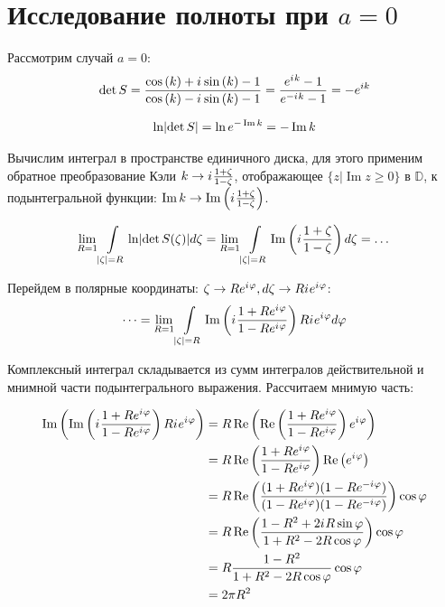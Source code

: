 \documentclass{nsart_eng}
\let\ge\geqslant
\DeclarePairedDelimiter{\abs}{\lvert}{\rvert}
\newcommand{\bbD}{\mathbb{D}}
\newcommand{\eexp}[1]{e^{#1}}
\newcommand{\iu}{{i\mkern1mu}}
\renewcommand{\Re}{\operatorname{Re}}
\renewcommand{\Im}{\operatorname{Im}}
\renewcommand{\phi}{\varphi}
\begin{document}
\section{Исследование полноты при $a=0$}
Рассмотрим случай $a=0$:
\[
\det S
= \frac
{\cos\left(k\right) + \iu \sin\left(k\right) - 1}
{\cos\left(k\right) - \iu \sin\left(k\right) - 1}
= \frac{\eexp{\iu k} - 1}{\eexp{-\iu k} - 1}
= -\eexp{i k}
\]

\[
\ln \abs{\det S} = \ln \eexp{- \Im k} = -\Im k
\]


Вычислим интеграл в пространстве единичного диска, для этого применим обратное преобразование Кэли $k \to \iu \frac{1 + \zeta}{1 - \zeta}$, отображающее $\{ z \vert \Im z \ge 0 \}$ в $\bbD$, к подынтегральной функции: $\Im k \to \Im \left( \iu \frac{1 + \zeta}{1 - \zeta} \right) $.

\[
  \lim\limits_{R = 1} \int\limits_{\abs{\zeta} = R} \ln \abs{\det S(\zeta)} d \zeta
= \lim\limits_{R = 1} \int\limits_{\abs{\zeta} = R} \Im \left( \iu \frac{1 + \zeta}{1 - \zeta} \right)  d\zeta = \dots
\]

Перейдем в полярные координаты: $\zeta \to R \eexp{\iu \phi}, d\zeta \to R \iu \eexp{\iu \phi}$:
\[
\dots = \lim\limits_{R = 1} \int\limits_{\abs{\zeta} = R} \Im \left( \iu \frac{1 + R \eexp{\iu \phi}}{1 - R \eexp{\iu \phi}} \right) R \iu \eexp{\iu \phi} d\phi
\]

Комплексный интеграл складывается из сумм интегралов действительной и мнимной части подынтегрального выражения. Рассчитаем мнимую часть:

\begin{align*}
\Im \left(  \Im \left( \iu \frac{1 + R \eexp{\iu \phi}}{1 - R \eexp{\iu \phi}} \right) R \iu \eexp{\iu \phi} \right)
 &= R \Re \left(  \Re \left( \frac{1 + R \eexp{\iu \phi}}{1 - R \eexp{\iu \phi}} \right) \eexp{\iu \phi} \right) \\
 &= R \Re \left( \frac{1 + R \eexp{\iu \phi}}{1 - R \eexp{\iu \phi}} \right) \Re \left(   \eexp{\iu \phi} \right) \\
 &= R \Re \left( \frac{(1 + R \eexp{\iu \phi}) (1 - R \eexp{-\iu \phi}) }{(1 - R \eexp{\iu \phi}) (1 - R \eexp{-\iu \phi})} \right) \cos \phi \\
 &= R \Re \left( \frac{1 - R^2 + 2 \iu R \sin \phi}{1 + R^2 - 2 R \cos \phi} \right) \cos \phi \\
 &= R \frac{1 - R^2}{1 + R^2 - 2 R \cos \phi} \cos \phi \\
 &= 2 \pi R^2
\end{align*}
\end{document}
